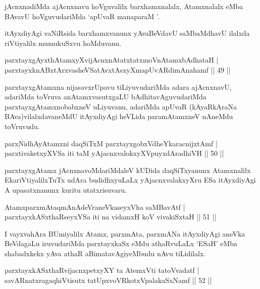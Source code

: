 \begin{artha}
jAcnxnadiMda ajAcnxnavu hoVguvalilx barxhamxnalalx, Atamxnalalx eMba BAvavU hoVguvudariMda `apUvaR manaparaM '.

itAyxdiyAgi vaNiRsida barxhamxvanunx yAvaBeVdavU saMbaMdhavU ilalxda riVtiyalilx mumukuSxvu hoMduvanu.
\end{artha}

\begin{shl}
parxtayxgAyxthAtamxyXvijAcnxnAtatxtatxmoVnAtamxbAdhataH |\\
parxtayxknABxtArxvasheVSatAvxtAsxyXmapUvARdimAnahamf \hfill || 49 ||
\end{shl}

\begin{artha}
parxtayxgAtamxna nijasavxrUpavu tiLiyuvudariMda adara ajAcnxnavU, adariMda toVruva anAtamxvasutxgaLU bAdhitavAguvudariMda parxtayxgAtamxnobabxneV uLiyuvanu, adariMda apUvaR (kAyaRkAraNa BAva)vilalxdavaneMdU itAyxdiyAgi heVLida paramAtamxneV nAneMdu toVruvudu.
\end{artha}

\begin{shl}
parxNidhAyA\s \s tamxni daqSiTxM parxtayxgobxVdheYkaracnijxtAmf |\\
parxtivaketxyXVSa iti taM yAjacnxvalokxyXV\s puyxdAradhiVH \hfill || 50 ||
\end{shl}

\begin{artha}%
parxtayxgAtamx jAcnxnavoMdariMdaleV kUDida daqSiTxyanunx Atamxnalilx EkariVtiyalilxTuTx udAra budidhxyuLaLx yAjacnxvalakxyXru ESa itAyxdiyAgi A upasatxnanunx kuritu utatxrisuvaru.
\end{artha}


\begin{shl}
AtamxparxmAtaqmAnAdeVraneVkaseyxVha saMBavAtf |\\
parxtayxkASxthaRseyxYSa iti na vidamxH koV vivakiSxtaH \hfill || 51 ||
\end{shl}

\begin{artha}
I vayxvahAra BUmiyalilx Atamx, parxmAta, parxmANa itAyxdiyAgi aneVka BeVdagaLu iruvudariMda parxtayxkaSx eMdu athaRvuLaLx `ESaH' eMba shabadxkekx yAva athaR aBimatavAgiyeMbudu nAvu tiLidilalx.
\end{artha}

\begin{shl}
parxtayxkASxthaRvijacnxpetxyXY ta AtemxVti tatoV\s vadatf |\\
savARnatxragaqhiVtisutx tatUpxvoVRkotxVpalakaSxNamf \hfill || 52 ||
\end{shl}

